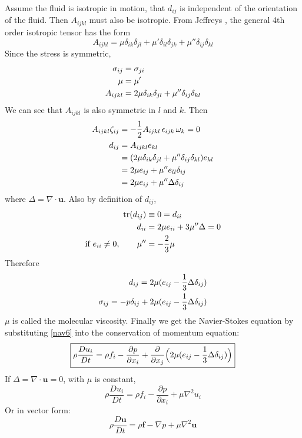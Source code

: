 Assume the fluid is isotropic in motion, that $d_{ij}$ is
independent of the orientation of the fluid. Then $A_{ijkl}$ must
also be isotropic. From Jeffreys \cite[p.70]{Tensor}, the general
4th order isotropic tensor has the form
\begin{equation}\label{nav5}
    A_{ijkl}=\mu\delta_{ik}\delta_{jl}+\mu'\delta_{il}\delta_{jk}+\mu''\delta_{ij}\delta_{kl}
\end{equation}
Since the stress is symmetric,
\begin{align}
    \sigma_{ij}&=\sigma_{ji}\notag\\
    \mu&=\mu'\notag\\
    A_{ijkl}&=2\mu\delta_{ik}\delta_{jl}+\mu''\delta_{ij}\delta_{kl}
\end{align}
We can see that $A_{ijkl}$ is also symmetric in $l$ and $k$. Then
\begin{align}
    A_{ijkl}\zeta_{ij}&=-\frac{1}{2}A_{ijkl}\,\epsilon_{ijk}\,\omega_k=0\notag\\
    d_{ij}&=A_{ijkl}e_{kl}\notag\\
    &=(2\mu\delta_{ik}\delta_{jl}+\mu''\delta_{ij}\delta_{kl})e_{kl}\notag\\
    &=2\mu e_{ij}+\mu''e_{ll}\delta_{ij}\notag\\
    &=2\mu e_{ij}+\mu''\Delta\delta_{ij}
\end{align}
where $\Delta=\nabla\cdot\mathbf{u}$. Also by definition of
$d_{ij}$,
\begin{align}
    \text{tr}(d_{ij})&\equiv 0 = d_{ii}\notag\\
    d_{ii}&=2\mu e_{ii}+3\mu''\Delta=0\notag\\
    \text{if $e_{ii}\neq 0$},\qquad \mu''&=-\frac{2}{3}\mu
\end{align}
Therefore
\begin{align}
    d_{ij}=2\mu(e_{ij}-\frac{1}{3}\Delta\delta_{ij})\notag\\
    \sigma_{ij}=-p\delta_{ij}+2\mu(e_{ij}-\frac{1}{3}\Delta\delta_{ij})\label{nav6}
\end{align}
$\mu$ is called the molecular viscosity. Finally we get the
Navier-Stokes equation by substituting \eqref{nav6} into the
conservation of momentum equation:
\begin{equation}\label{nav:eq}
    \boxed{\rho\frac{D u_i}{D t} = \rho f_i - \frac{\partial p}{\partial
    x_i}+\frac{\partial}{\partial x_j}\Bigl(2\mu(e_{ij}-\frac{1}{3}\Delta\delta_{ij})\Bigr)}
\end{equation}
If $\Delta=\nabla\cdot\mathbf{u}=0$, with $\mu$ is constant,
\begin{equation}\label{nav:eq2}
    \rho\frac{D u_i}{D t} = \rho f_i - \frac{\partial p}{\partial
    x_i}+\mu\nabla^2 u_i
\end{equation}
Or in vector form:
\begin{equation}\label{nav:eq3}
    \rho\frac{D \mathbf{u}}{D t} = \rho \mathbf{f} - \nabla p + \mu\nabla^2 \mathbf{u}
\end{equation}
